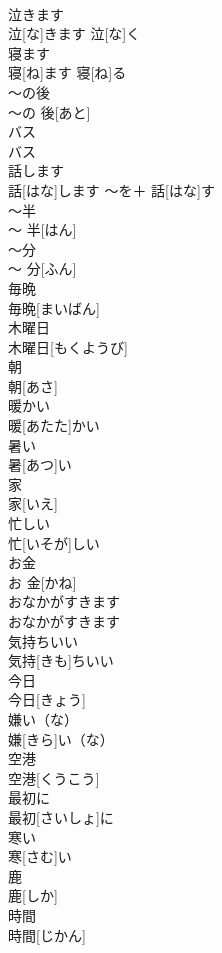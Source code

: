 \documentclass[8pt]{extreport}
\begin{document}
\begin{CJK}{UTF8}{min}
\\	泣きます	
\\	泣[な]きます	泣[な]く	
\\	寝ます	
\\	寝[ね]ます	寝[ね]る	
\\	〜の後	
\\	〜の 後[あと]		
\\	バス	
\\	バス		
\\	話します	
\\	話[はな]します	〜を＋ 話[はな]す	
\\	〜半	
\\	〜 半[はん]		
\\	〜分	
\\	〜 分[ふん]		
\\	毎晩	
\\	毎晩[まいばん]		
\\	木曜日	
\\	木曜日[もくようび]		
\\	朝	
\\	朝[あさ]		
\\	暖かい	
\\	暖[あたた]かい		
\\	暑い	
\\	暑[あつ]い		
\\	家	
\\	家[いえ]		
\\	忙しい	
\\	忙[いそが]しい		
\\	お金	
\\	お 金[かね]		
\\	おなかがすきます	
\\	おなかがすきます		
\\	気持ちいい	
\\	気持[きも]ちいい		
\\	今日	
\\	今日[きょう]		
\\	嫌い（な）	
\\	嫌[きら]い（な）		
\\	空港	
\\	空港[くうこう]		
\\	最初に	
\\	最初[さいしょ]に		
\\	寒い	
\\	寒[さむ]い		
\\	鹿	
\\	鹿[しか]		
\\	時間	
\\	時間[じかん]		

\end{CJK}
\end{document}
